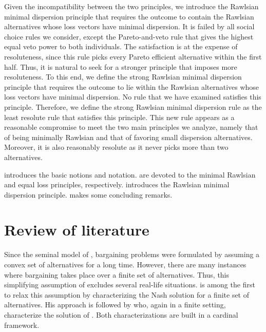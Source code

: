 \documentclass[pagesize, twoside=off, bibliography=totoc, DIV=calc, fontsize=12pt, a4paper]{scrartcl}
\begin{document}
Given the incompatibility between the two principles, we introduce the Rawlsian minimal dispersion principle that requires the outcome to contain the Rawlsian alternatives whose loss vectors have minimal dispersion. It is failed by all social choice rules we consider, except the Pareto-and-veto rule that gives the highest equal veto power to both individuals. The satisfaction is at the expense of resoluteness, since this rule picks every Pareto efficient alternative within the first half. Thus, it is natural to seek for a stronger principle that imposes more resoluteness. To this end, we define the strong Rawlsian minimal dispersion principle that requires the outcome to lie within the Rawlsian alternatives whose loss vectors have minimal dispersion. No rule that we have examined satisfies this principle. Therefore, we define the strong Rawlsian minimal dispersion rule as the least resolute rule that satisfies this principle. This new rule appears as a reasonable compromise to meet the two main principles we analyze, namely that of being minimally Rawlsian and that of favoring small dispersion alternatives. Moreover, it is also reasonably resolute as it never picks more than two alternatives.

 introduces the basic notions and notation. 
 are devoted to the minimal Rawlsian and equal loss principles, respectively.  introduces the Rawlsian minimal dispersion principle.  makes some concluding remarks.

\section{Review of literature}
\label{sec:rev}
Since the seminal model of \citet{Nash1950}, bargaining problems were formulated by assuming a convex set of alternatives for a long time. However, there are many instances where bargaining takes place over a finite set of alternatives. Thus, this simplifying assumption of \citeauthor{Nash1950} excludes several real-life situations.
 is among the first to relax this assumption by characterizing the Nash solution for a finite set of alternatives. His approach is followed by \citet{nagahisa2002axiomatization} who, again in a finite setting, characterize the solution of \citet{kalai1975other}. Both characterizations are built in a cardinal framework.
\end{document}
